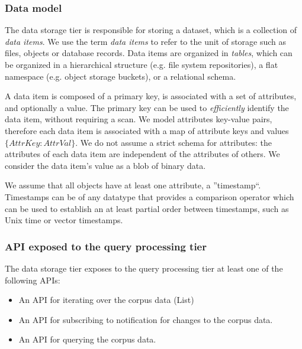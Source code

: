 \subsubsection{Data model}
The data storage tier is responsible for storing a dataset, which is a collection of \textit{data items}.
We use the term \textit{data items} to refer to the unit of storage such as files, objects or database records.
Data items are organized in \textit{tables}, which can be organized in a hierarchical structure
(e.g. file system repositories), a flat namespace (e.g. object storage buckets), or a relational schema.

A data item is composed of a primary key, is associated with a set of attributes, and optionally a value.
The primary key can be used to \textit{efficiently} identify the data item, without requiring a scan.
We model attributes key-value pairs, therefore each data item is associated with a map of attribute keys and values
$\{AttrKey: AttrVal\}$.
We do not assume a strict schema for attributes: the attributes of each data item are independent of the attributes of
others.
We consider the data item's value as a blob of binary data.

We assume that all objects have at least one attribute, a ''timestamp``.
Timestamps can be of any datatype that provides a comparison operator which can be used to establish an at least partial
order between timestamps, such as Unix time or vector timestamps.

\subsubsection{API exposed to the query processing tier}

The data storage tier exposes to the query processing tier at least one of the following APIs:
\begin{itemize}
  \item An API for iterating over the corpus data (List)
  \item An API for subscribing to notification for changes to the corpus data.
  \item An API for querying the corpus data.
\end{itemize}


